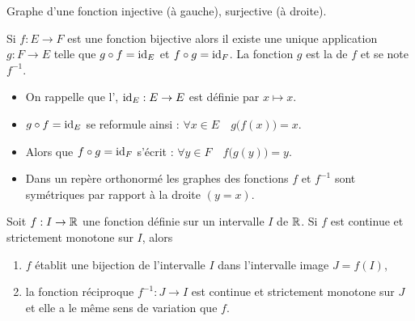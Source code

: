 \documentclass[10pt,class=article,crop=false]{standalone}
\begin{document}
\begin{multicols}{2}
Graphe d'une fonction injective (à gauche), surjective (à droite).

\begin{proposition}
	Si $f :  E \to F$ est une fonction bijective alors il existe une
	unique application $g : F \to E$ telle que $g\circ f = \operatorname{id}_E$ et $f\circ g = \operatorname{id}_F$.
	La fonction $g$ est la  de $f$ et se note $f^{-1}$.
\end{proposition}


	\begin{itemize}
		\item On rappelle que l', $\operatorname{id}_E : E \to E$ est  définie par $x \mapsto x$.
		
		\item $g \circ f = \operatorname{id}_E$ se reformule ainsi : $\forall x \in E\quad  g\big(f(x)\big) = x$.
		
		\item  Alors que $f \circ g = \operatorname{id}_F$  s'écrit : $\forall y \in F\quad  f\big(g(y)\big) = y$.
		
		\item Dans un repère orthonormé les graphes des fonctions $f$ et $f^{-1}$ sont symétriques
		par rapport à la droite $(y=x)$.
	\end{itemize}
	




\begin{theoreme}
	Soit $f:I\to \mathbb{R}$ une fonction définie sur un intervalle $I$ de $\mathbb{R}$. Si $f$ est continue
	et strictement monotone sur $I$, alors
	\begin{enumerate}
		\item $f$ établit une bijection de l'intervalle $I$ dans l'intervalle image $J=f(I)$,
		\item la fonction réciproque $f^{-1}:J\to I$ est continue et strictement monotone
		sur $J$ et elle a le même sens de variation que $f$.
	\end{enumerate}
\end{theoreme}




\end{multicols}
\end{document}
